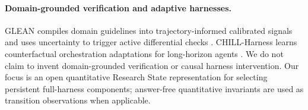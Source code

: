 \paragraph{Domain-grounded verification and adaptive harnesses.}
GLEAN compiles domain guidelines into trajectory-informed calibrated signals and
uses uncertainty to trigger active differential checks
\citep{zhang2026glean}. CHILL-Harness learns counterfactual orchestration
adaptations for long-horizon agents \citep{fu2026chill}. We do not claim to
invent domain-grounded verification or causal harness intervention. Our focus is
an open quantitative Research State representation for selecting persistent
full-harness components; answer-free quantitative invariants are used as
transition observations when applicable.
